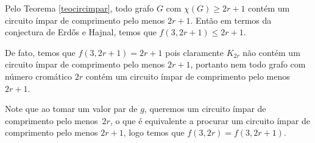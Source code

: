 Pelo Teorema \ref{teocircimpar}, todo grafo $G$ com $\chi(G) \geq 2r+1$ contém um circuito ímpar de comprimento pelo menos $2r+1$. Então em termos da conjectura de Erd\H{o}s e Hajnal, temos que $f(3,2r+1) \leq 2r+1$.

De fato, temos que $f(3,2r+1) = 2r+1$ pois claramente $K_{2r}$ não contém um circuito ímpar de comprimento pelo menos $2r+1$, portanto nem todo grafo com número cromático $2r$ contém um circuito ímpar de comprimento pelo menos $2r+1$.

Note que ao tomar um valor par de $g$, queremos um circuito ímpar de comprimento pelo menos~$2r$, o que é equivalente a procurar um circuito ímpar de comprimento pelo menos $2r+1$, logo temos que $f(3,2r) = f(3,2r+1)$.